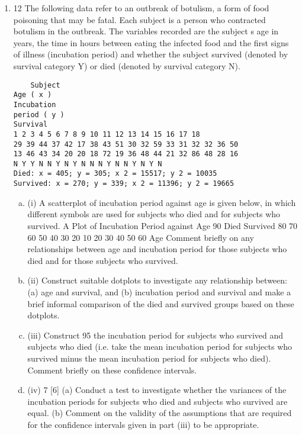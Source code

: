 \documentclass[a4paper,12pt]{article}
\begin{document}
\begin{enumerate}
\item
12
The following data refer to an outbreak of botulism, a form of food poisoning that
may be fatal. Each subject is a person who contracted botulism in the outbreak. The
variables recorded are the subject s age in years, the time in hours between eating the
infected food and the first signs of illness (incubation period) and whether the subject
survived (denoted by survival category Y) or died (denoted by survival category N).
\begin{verbatim}
    Subject
Age ( x )
Incubation
period ( y )
Survival
1 2 3 4 5 6 7 8 9 10 11 12 13 14 15 16 17 18
29 39 44 37 42 17 38 43 51 30 32 59 33 31 32 32 36 50
13 46 43 34 20 20 18 72 19 36 48 44 21 32 86 48 28 16
N Y Y N N Y N Y N N N Y N N Y N Y N
Died: x = 405; y = 305; x 2 = 15517; y 2 = 10035
Survived: x = 270; y = 339; x 2 = 11396; y 2 = 19665
\end{verbatim}

\begin{enumerate}[(a)]
\item (i)
A scatterplot of incubation period against age is given below, in which
different symbols are used for subjects who died and for subjects who
survived.
A Plot of Incubation Period against Age
90
Died
Survived
80
70
60
50
40
30
20
10
20
30
40
50
60
Age
Comment briefly on any relationships between age and incubation period for
those subjects who died and for those subjects who survived.
\item  (ii)
Construct suitable dotplots to investigate any relationship between:
(a) age and survival, and
(b) incubation period and survival
and make a brief informal comparison of the died and survived groups based
on these dotplots.
\item (iii)
Construct 95%
the incubation period for subjects who survived and subjects who died (i.e.
take the mean incubation period for subjects who survived minus the mean
incubation period for subjects who died).
Comment briefly on these confidence intervals.
\item  (iv)
7
[6]
(a) Conduct a test to investigate whether the variances of the incubation
periods for subjects who died and subjects who survived are equal.
(b) Comment on the validity of the assumptions that are required for the
confidence intervals given in part (iii) to be appropriate.
\end{enumerate}



\end{enumerate}
\end{document}
